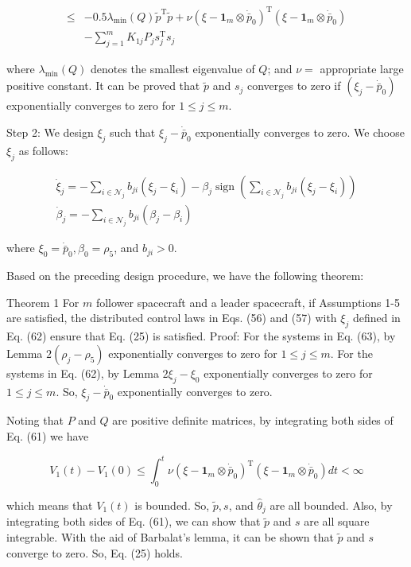 \documentclass[10pt]{article}
\begin{document}
$$
\begin{aligned}
\leq & -0.5 \lambda_{\min }(Q) \tilde{p}^{\mathrm{T}} \tilde{p}+\nu\left(\xi-\mathbf{1}_{m} \otimes \dot{\bar{p}}_{0}\right)^{\mathrm{T}}\left(\xi-\mathbf{1}_{m} \otimes \dot{\bar{p}}_{0}\right) \\
& -\sum_{j=1}^{m} K_{1 j} P_{j} s_{j}^{\mathrm{T}} s_{j}
\end{aligned}
$$

where $\lambda_{\min }(Q)$ denotes the smallest eigenvalue of $Q$; and $\nu=$ appropriate large positive constant. It can be proved that $\tilde{p}$ and $s_{j}$ converges to zero if $\left(\xi_{j}-\dot{\bar{p}}_{0}\right)$ exponentially converges to zero for $1 \leq j \leq m$.

Step 2: We design $\xi_{j}$ such that $\xi_{j}-\dot{\bar{p}}_{0}$ exponentially converges to zero. We choose $\xi_{j}$ as follows:

$$
\begin{gathered}
\dot{\xi}_{j}=-\sum_{i \in \mathcal{N}_{j}} b_{j i}\left(\xi_{j}-\xi_{i}\right)-\beta_{j} \operatorname{sign}\left(\sum_{i \in \mathcal{N}_{j}} b_{j i}\left(\xi_{j}-\xi_{i}\right)\right) \\
\dot{\beta}_{j}=-\sum_{i \in \mathcal{N}_{j}} b_{j i}\left(\beta_{j}-\beta_{i}\right)
\end{gathered}
$$

where $\xi_{0}=\dot{\bar{p}}_{0}, \beta_{0}=\rho_{5}$, and $b_{j i}>0$.

Based on the preceding design procedure, we have the following theorem:

Theorem 1 For $m$ follower spacecraft and a leader spacecraft, if Assumptions 1-5 are satisfied, the distributed control laws in Eqs. (56) and (57) with $\xi_{j}$ defined in Eq. (62) ensure that Eq. (25) is satisfied. Proof: For the systems in Eq. (63), by Lemma $2\left(\rho_{j}-\rho_{5}\right)$ exponentially converges to zero for $1 \leq j \leq m$. For the systems in Eq. (62), by Lemma $2 \xi_{j}-\xi_{0}$ exponentially converges to zero for $1 \leq j \leq m$. So, $\xi_{j}-\dot{\bar{p}}_{0}$ exponentially converges to zero.

Noting that $P$ and $Q$ are positive definite matrices, by integrating both sides of Eq. (61) we have

$$
V_{1}(t)-V_{1}(0) \leq \int_{0}^{t} \nu\left(\xi-\mathbf{1}_{m} \otimes \dot{\bar{p}}_{0}\right)^{\mathrm{T}}\left(\xi-\mathbf{1}_{m} \otimes \dot{\bar{p}}_{0}\right) d t<\infty
$$

which means that $V_{1}(t)$ is bounded. So, $\tilde{p}, s$, and $\hat{\theta}_{j}$ are all bounded. Also, by integrating both sides of Eq. (61), we can show that $\tilde{p}$ and $s$ are all square integrable. With the aid of Barbalat's lemma, it can be shown that $\tilde{p}$ and $s$ converge to zero. So, Eq. (25) holds.
\end{document}
